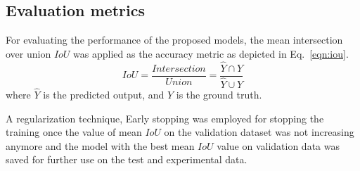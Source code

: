 \subsection{Evaluation metrics}
For evaluating the performance of the proposed models, the mean intersection over union \(IoU\) was applied as the accuracy metric as depicted in Eq.~\ref{eqn:iou}. 
\begin{equation}
	IoU=\frac{Intersection}{Union}=\frac{\hat{Y} \cap Y}{\hat{Y} \cup Y}
	\label{eqn:iou}
\end{equation}
where \(\hat{Y}\) is the predicted output, and \(Y\) is the ground truth.

A regularization technique, Early stopping was employed for stopping the training once the value of mean \(IoU\) on the validation dataset was not increasing anymore and the model with the best mean \(IoU\) value on validation data was saved for further use on the test and experimental data.
